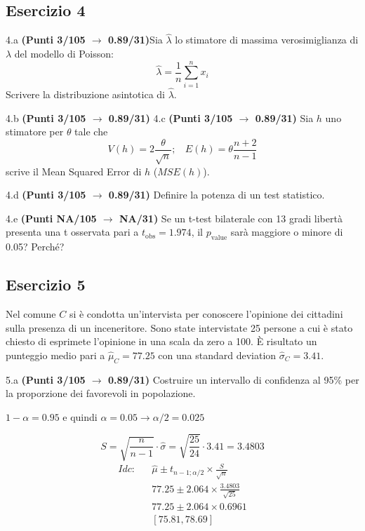 \documentclass[
  11pt,
]{book}
\theoremstyle{mytheoremstyle}
\theoremstyle{mydefstyle}
\newenvironment{sol}
  {
  \begin{tcolorbox}[enhanced,breakable,arc=0.1mm,boxrule=1pt,colback=white,colframe=iblue,
  title=\bf \fontfamily{lmss}\selectfont \hspace{.5 cm} Soluzione,drop fuzzy shadow]

}{
\end{tcolorbox}
  }
\begin{document}
\subsection{Esercizio 4}\label{esercizio-4-29}

4.a \textbf{(Punti 3/105 \(\rightarrow\) 0.89/31)}Sia \(\hat \lambda\) lo stimatore di massima verosimiglianza di \(\lambda\) del modello di Poisson:
\[\hat\lambda =  \frac 1n\sum_{i=1}^nx_i\]
Scrivere la distribuzione asintotica di \(\hat \lambda\).

4.b \textbf{(Punti 3/105 \(\rightarrow\) 0.89/31)} 4.c \textbf{(Punti 3/105 \(\rightarrow\) 0.89/31)} Sia \(h\) uno stimatore per \(\theta\) tale che
\[V(h)=2\frac\theta {\sqrt{n}};~~~~E(h)=\theta\frac{n+2}{n-1}\]
scrive il Mean Squared Error di \(h\) (\(MSE(h)\)).

4.d \textbf{(Punti 3/105 \(\rightarrow\) 0.89/31)} Definire la potenza di un test statistico.

4.e \textbf{(Punti NA/105 \(\rightarrow\) NA/31)} Se un t-test bilaterale con 13 gradi libertà presenta una
t osservata pari a \(t_\text{obs}=1.974\), il \(p_\text{value}\) sarà maggiore o minore di 0.05? Perché?

\subsection{Esercizio 5}\label{esercizio-5-28}

Nel comune \(C\) si è condotta un'intervista per conoscere l'opinione
dei cittadini sulla presenza di un inceneritore. Sono state intervistate
25 persone a cui è stato chiesto di esprimete l'opinione in una scala da zero a 100.
È risultato un punteggio medio pari a \(\hat\mu_C=77.25\) con una standard deviation
\(\hat\sigma_C=3.41\).

5.a \textbf{(Punti 3/105 \(\rightarrow\) 0.89/31)} Costruire un intervallo di confidenza al 95\%
per la proporzione dei favorevoli in popolazione.

\begin{sol}
\(1-\alpha =0.95\) e quindi \(\alpha=0.05\rightarrow \alpha/2=0.025\)

\[
      S  =\sqrt{\frac {n}{n-1}}\cdot\hat\sigma =
     \sqrt{\frac { 25 }{ 24 }}\cdot 3.41 = 3.4803 
\]
\begin{eqnarray*}
  Idc: & &  \hat\mu \pm  t_{n-1;\alpha/2} \times \frac{S}{\sqrt{n}} \\
     & &  77.25 \pm  2.064 \times \frac{ 3.4803 }{\sqrt{ 25 }} \\
     & &  77.25 \pm  2.064 \times  0.6961 \\
     & & [ 75.81 ,  78.69 ]
\end{eqnarray*}

\end{sol}
\end{document}
